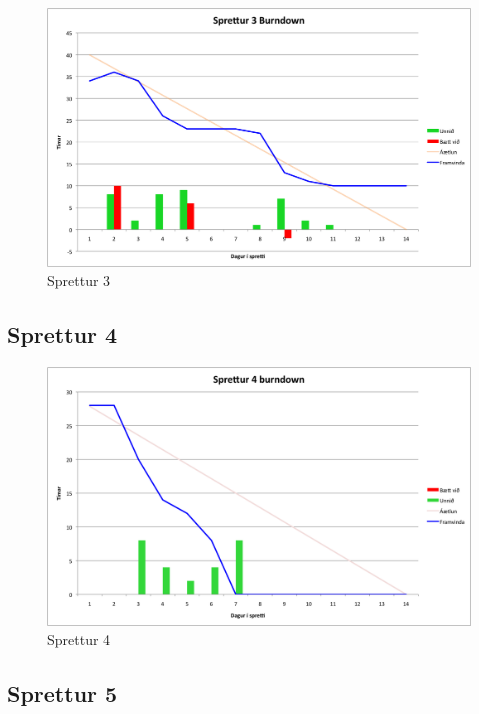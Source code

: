 \documentclass{article}
\begin{document}
\begin{figure}[H]
  \centering
  \includegraphics[width=1\textwidth]{Sprettur3_Burndown.png} 
  \caption{Sprettur 3} 
\end{figure}

\subsection{Sprettur 4}

\begin{figure}[H]
  \centering
  \includegraphics[width=1\textwidth]{Sprettur4_Burndown.png} 
  \caption{Sprettur 4} 
\end{figure}

\subsection{Sprettur 5}
\end{document}
